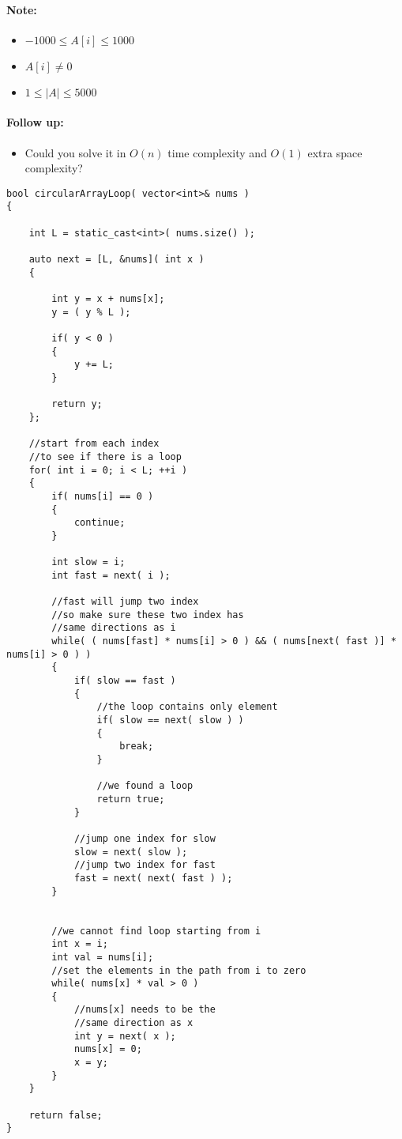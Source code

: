\paragraph{Note:}

\begin{itemize}
\item $-1000 \leq A[i] \leq 1000$
\item $A[i] \neq 0$
\item $1 \leq \lvert A\rvert \leq 5000$
 \end{itemize}

\paragraph{Follow up:}

\begin{itemize}
\item Could you solve it in $O(n)$ time complexity and $O(1)$ extra space complexity?
\end{itemize}

\setcounter{lstlisting}{0}
\begin{lstlisting}[style=customc, caption={Fast And Slow Pointers}]
bool circularArrayLoop( vector<int>& nums )
{

    int L = static_cast<int>( nums.size() );

    auto next = [L, &nums]( int x )
    {

        int y = x + nums[x];
        y = ( y % L );

        if( y < 0 )
        {
            y += L;
        }

        return y;
    };

    //start from each index
    //to see if there is a loop
    for( int i = 0; i < L; ++i )
    {
        if( nums[i] == 0 )
        {
            continue;
        }

        int slow = i;
        int fast = next( i );

        //fast will jump two index
        //so make sure these two index has
        //same directions as i
        while( ( nums[fast] * nums[i] > 0 ) && ( nums[next( fast )] * nums[i] > 0 ) )
        {
            if( slow == fast )
            {
                //the loop contains only element
                if( slow == next( slow ) )
                {
                    break;
                }

                //we found a loop
                return true;
            }

            //jump one index for slow
            slow = next( slow );
            //jump two index for fast
            fast = next( next( fast ) );
        }


        //we cannot find loop starting from i
        int x = i;
        int val = nums[i];
        //set the elements in the path from i to zero
        while( nums[x] * val > 0 )
        {
            //nums[x] needs to be the
            //same direction as x
            int y = next( x );
            nums[x] = 0;
            x = y;
        }
    }

    return false;
}

\end{lstlisting}